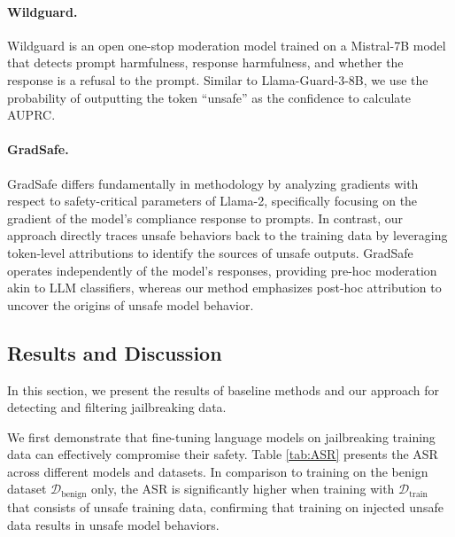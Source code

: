 \documentclass[11pt]{article}
\begin{document}
\paragraph{Wildguard.} Wildguard \cite{han2024wildguardopenonestopmoderation} is an open one-stop moderation model trained on a Mistral-7B model that detects prompt harmfulness, response harmfulness, and whether the response is a refusal to the prompt. Similar to Llama-Guard-3-8B, we use the probability of outputting the token ``unsafe'' as the confidence to calculate AUPRC.

\paragraph{GradSafe.} 
GradSafe \cite{xie2024gradsafedetectingjailbreakprompts} differs fundamentally in methodology by analyzing gradients with respect to safety-critical parameters of Llama-2, specifically focusing on the gradient of the model's compliance response to prompts. In contrast, our approach directly traces unsafe behaviors back to the training data by leveraging token-level attributions to identify the sources of unsafe outputs. GradSafe operates independently of the model's responses, providing pre-hoc moderation akin to LLM classifiers, whereas our method emphasizes post-hoc attribution to uncover the origins of unsafe model behavior.

\subsection{Results and Discussion}

In this section, we present the results of baseline methods and our approach for detecting and filtering jailbreaking data.

We first demonstrate that fine-tuning language models on jailbreaking training data can effectively compromise their safety. 
Table \ref{tab:ASR} presents the ASR across different models and datasets.
In comparison to training on the benign dataset $\mathcal{D}_{\text{benign}}$ only, the ASR is significantly higher when training with $\mathcal{D}_{\text{train}}$ that consists of unsafe training data, confirming that training on injected unsafe data results in unsafe model behaviors.
\end{document}
